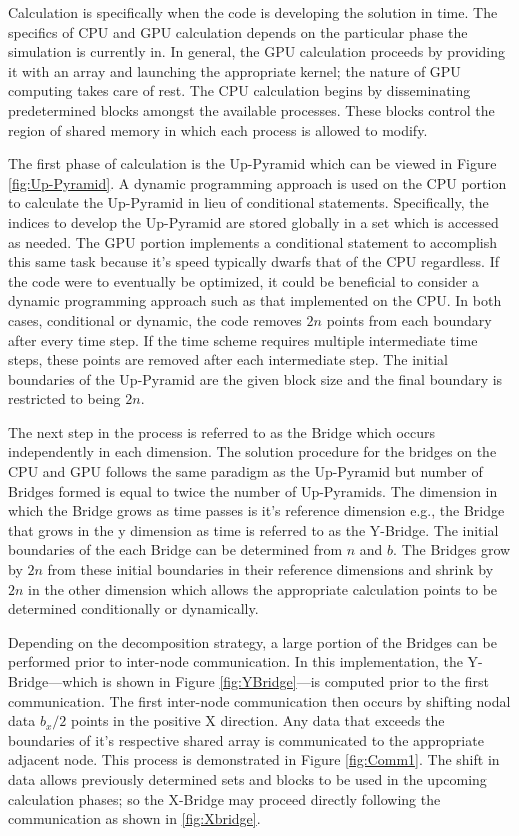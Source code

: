 \documentclass[review]{elsarticle}
\begin{document}
 \par
 Calculation is specifically when the code is developing the solution in time. The specifics of CPU and GPU calculation depends on the particular phase the simulation is currently in. In general, the GPU calculation proceeds by providing it with an array and launching the appropriate kernel; the nature of GPU computing takes care of rest. The CPU calculation begins by disseminating predetermined blocks amongst the available processes. These blocks control the region of shared memory in which each process is allowed to modify.
 
\par
The first phase of calculation is the Up-Pyramid which can be viewed in Figure \ref{fig:Up-Pyramid}. A dynamic programming approach is used on the CPU portion to calculate the Up-Pyramid in lieu of conditional statements. Specifically, the indices to develop the Up-Pyramid are stored globally in a set which is accessed as needed. The GPU portion implements a conditional statement to accomplish this same task because it's speed typically dwarfs that of the CPU regardless. If the code were to eventually be optimized, it could be beneficial to consider a dynamic programming approach such as that implemented on the CPU. In both cases, conditional or dynamic, the code removes $2n$ points from each boundary after every time step. If the time scheme requires multiple intermediate time steps, these points are removed after each intermediate step. The initial boundaries of the Up-Pyramid are the given block size and the final boundary is restricted to being $2n$.

\par The next step in the process is referred to as the Bridge which occurs independently in each dimension. The solution procedure for the bridges on the CPU and GPU follows the same paradigm as the Up-Pyramid but number of Bridges formed is equal to twice the number of Up-Pyramids. The dimension in which the Bridge grows as time passes is it's reference dimension e.g., the Bridge that grows in the y dimension as time is referred to as the Y-Bridge. The initial boundaries of the each Bridge can be determined from $n$ and $b$. The Bridges grow by $2n$ from these initial boundaries in their reference dimensions and shrink by $2n$ in the other dimension which allows the appropriate calculation points to be determined conditionally or dynamically.

\par
Depending on the decomposition strategy, a large portion of the Bridges can be performed prior to inter-node communication. In this implementation, the Y-Bridge---which is shown in Figure \ref{fig:YBridge}---is computed prior to the first communication. The first inter-node communication then occurs by shifting nodal data $b_x/2$ points in the positive X direction. Any data that exceeds the boundaries of it's respective shared array is communicated to the appropriate adjacent node. This process is demonstrated in Figure \ref{fig:Comm1}. The shift in data allows previously determined sets and blocks to be used in the upcoming calculation phases; so the X-Bridge may proceed directly following the communication as shown in \ref{fig:Xbridge}.
\end{document}
